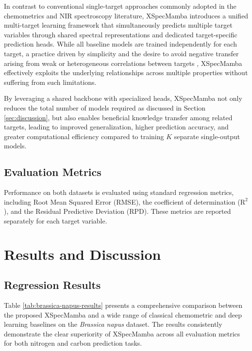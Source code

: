 \documentclass[pdflatex,sn-mathphys-num]{sn-jnl}%
\begin{document}
In contrast to conventional single-target approaches commonly adopted in the chemometrics and NIR spectroscopy literature, XSpecMamba introduces a unified multi-target learning framework that simultaneously predicts multiple target variables through shared spectral representations and dedicated target-specific prediction heads. While all baseline models are trained independently for each target, a practice driven by simplicity and the desire to avoid negative transfer arising from weak or heterogeneous correlations between targets \cite{liu2025multi,junior2020multi}, XSpecMamba effectively exploits the underlying relationships across multiple properties without suffering from such limitations.

By leveraging a shared backbone with specialized heads, XSpecMamba not only reduces the total number of models required as discussed in Section \ref{sec:discussion}, but also enables beneficial knowledge transfer among related targets, leading to improved generalization, higher prediction accuracy, and greater computational efficiency compared to training $K$ separate single-output models.

\subsection{Evaluation Metrics}
Performance on both datasets is evaluated using standard regression metrics, including Root Mean Squared Error (RMSE), the coefficient of determination ($\text{R}^2$), and the Residual Predictive Deviation (RPD). These metrics are reported separately for each target variable. 

\section{Results and Discussion}
\subsection{Regression Results}\label{sec:regression-results}
Table \ref{tab:brassica-napus-results} presents a comprehensive comparison between the proposed XSpecMamba and a wide range of classical chemometric and deep learning baselines on the \textit{Brassica napus} dataset. The results consistently demonstrate the clear superiority of XSpecMamba across all evaluation metrics for both nitrogen and carbon prediction tasks.
\end{document}

